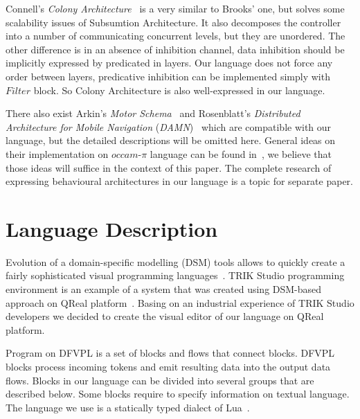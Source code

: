 \documentclass[conference,compsoc]{IEEEtran}
\begin{document}
Connell's \textit{Colony Architecture}~\cite{connell1989colony} is a very similar to Brooks' one, but solves some scalability issues of Subsumtion Architecture. It also decomposes the controller into a number of communicating concurrent levels, but they are unordered. The other difference is in an absence of inhibition channel, data inhibition should be implicitly expressed by predicated in layers. Our language does not force any order between layers, predicative inhibition can be implemented simply with $Filter$ block. So Colony Architecture is also well-expressed in our language.

There also exist Arkin’s \textit{Motor Schema}~\cite{arkin1987motor} and Rosenblatt’s \textit{Distributed Architecture for Mobile Navigation} (\textit{DAMN})~\cite{rosenblatt1997damn} which are compatible with our language, but the detailed descriptions will be omitted here. General ideas on their implementation on $occam\mbox{-}\pi$ language can be found in~\cite{simpson2009toward}, we believe that those ideas will suffice in the context of this paper. The complete research of expressing behavioural architectures in our language is a topic for separate paper.


\section{Language Description}
\label{sec:lang}

Evolution of a domain-specific modelling (DSM) tools allows to quickly create a fairly sophisticated visual programming languages~\cite{koznov2008}. TRIK Studio programming environment is an example of a system that was created using DSM-based approach on QReal platform~\cite{qrealMeta, kuzenkova2013qreal}. Basing on an industrial experience of TRIK Studio developers we decided to create the visual editor of our language on QReal platform.

Program on DFVPL is a set of blocks and flows that connect blocks. DFVPL blocks process incoming tokens and emit resulting data into the output data flows. Blocks in our language can be divided into several groups that are described below. Some blocks require to specify information on textual language. The language we use is a statically typed dialect of Lua~\cite{lua}.
\end{document}
